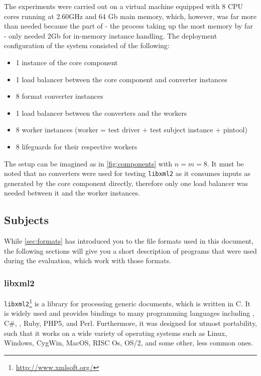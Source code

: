 The experiments were carried out on a virtual machine equipped with 8 CPU cores running at 2.60GHz and 64 Gb
main memory, which, however, was far more than needed because the \java part of \xmlmate{} - the process taking
up the most memory by far - only needed 2Gb for in-memory \xml instance handling. The deployment configuration
of the \xmlmate system consisted of the following:
\begin{itemize}
  \item 1 instance of the \java \xmlmate core component
  \item 1 load balancer between the core component and converter instances
  \item 8 format converter instances
  \item 1 load balancer between the converters and the workers
  \item 8 worker instances (worker = test driver + test subject instance + pintool)
  \item 8 lifeguards for their respective workers
\end{itemize}

The setup can be imagined as in \cref{fig:components} with $n = m = 8$.
It must be noted that no converters were used for testing \texttt{libxml2} as it consumes inputs as generated
by the \xmlmate core component directly, therefore only one load balancer was needed between it and
the worker instances.




\subsection{Subjects}
While \cref{sec:formats} has introduced you to the file formats used in this document, the following sections
will give you a short description of programs that were used during the evaluation, which work with those
formats.
\subsubsection{libxml2}
\texttt{libxml2}\footnote{\url{http://www.xmlsoft.org/}} is a library for processing generic \xml documents,
which is written in {\small C}. It is widely used and provides bindings to many programming languages
including \cpp, {\small C\#}, \python{}, {\small Ruby}, {\small PHP5}, and {\small Perl}. Furthermore, it was
designed for utmost portability, such that it works on a wide variety of operating systems such as
Linux, Windows, CygWin, MacOS, RISC Os, OS/2, and some other, less common ones.

